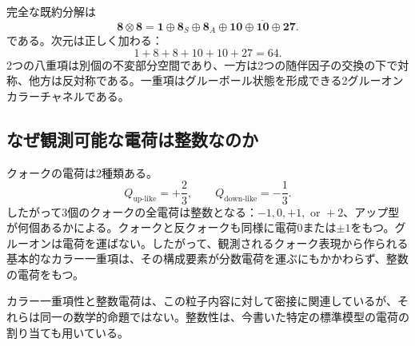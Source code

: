 完全な既約分解は
\begin{equation}
\boldsymbol 8\otimes\boldsymbol 8
=\boldsymbol 1\oplus\boldsymbol 8_S\oplus\boldsymbol 8_A
\oplus\boldsymbol{10}\oplus\overline{\boldsymbol{10}}
\oplus\boldsymbol{27}.
\label{eq:l4-eight-times-eight}
\end{equation}
である。次元は正しく加わる：
\begin{equation}
1+8+8+10+10+27=64.
\end{equation}
2つの八重項は別個の不変部分空間であり、一方は2つの随伴因子の交換の下で対称、他方は反対称である。一重項はグルーボール状態を形成できる2グルーオンカラーチャネルである。

\subsection{なぜ観測可能な電荷は整数なのか}

クォークの電荷は2種類ある。
\begin{equation}
Q_{\mathrm{up\text{-}like}}=+\frac23,
\qquad
Q_{\mathrm{down\text{-}like}}=-\frac13.
\end{equation}
したがって3個のクォークの全電荷は整数となる：\(-1,0,+1,\text{ or }+2\)、アップ型が何個あるかによる。クォークと反クォークも同様に電荷\(0\)または\(\pm1\)をもつ。グルーオンは電荷を運ばない。したがって、観測されるクォーク表現から作られる基本的なカラー一重項は、その構成要素が分数電荷を運ぶにもかかわらず、整数の電荷をもつ。

\begin{classroomqa}
\end{classroomqa}

カラー一重項性と整数電荷は、この粒子内容に対して密接に関連しているが、それらは同一の数学的命題ではない。整数性は、今書いた特定の標準模型の電荷の割り当ても用いている。

\begin{classroomqa}
\end{classroomqa}

